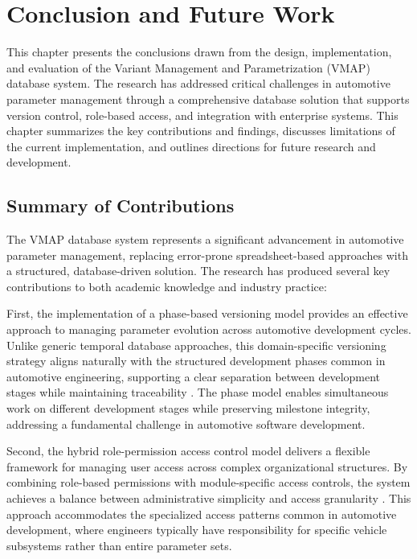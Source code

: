 \chapter{Conclusion and Future Work}
\label{chap:conclusion}

This chapter presents the conclusions drawn from the design, implementation, and evaluation of the Variant Management and Parametrization (VMAP) database system. The research has addressed critical challenges in automotive parameter management through a comprehensive database solution that supports version control, role-based access, and integration with enterprise systems. This chapter summarizes the key contributions and findings, discusses limitations of the current implementation, and outlines directions for future research and development.

\section{Summary of Contributions}
\label{sec:contributions-summary}

The VMAP database system represents a significant advancement in automotive parameter management, replacing error-prone spreadsheet-based approaches with a structured, database-driven solution. The research has produced several key contributions to both academic knowledge and industry practice:

First, the implementation of a phase-based versioning model provides an effective approach to managing parameter evolution across automotive development cycles. Unlike generic temporal database approaches, this domain-specific versioning strategy aligns naturally with the structured development phases common in automotive engineering, supporting a clear separation between development stages while maintaining traceability \cite{broy2006challenges}. The phase model enables simultaneous work on different development stages while preserving milestone integrity, addressing a fundamental challenge in automotive software development.

Second, the hybrid role-permission access control model delivers a flexible framework for managing user access across complex organizational structures. By combining role-based permissions with module-specific access controls, the system achieves a balance between administrative simplicity and access granularity \cite{ferraiolo2011policy}. This approach accommodates the specialized access patterns common in automotive development, where engineers typically have responsibility for specific vehicle subsystems rather than entire parameter sets.

